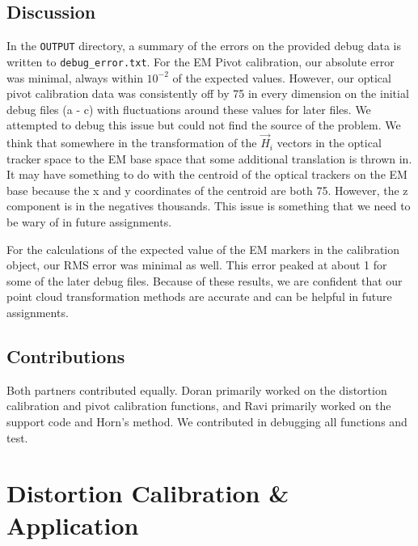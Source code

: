 \documentclass[letterpaper, 11pt]{report}
\begin{document}
\section{Discussion}
In the \texttt{OUTPUT} directory, a summary of the errors on the provided debug data is written to \texttt{debug\_error.txt}. For the EM Pivot calibration, our absolute error was minimal, always within $10^{-2}$ of the expected values. However, our optical pivot calibration data was consistently off by 75 in every dimension on the initial debug files (a - c) with fluctuations around these values for later files. We attempted to debug this issue but could not find the source of the problem.  We think that somewhere in the transformation of the $\vec H_i$ vectors in the optical tracker space to the EM base space that some additional translation is thrown in. It may have something to do with the centroid of the optical trackers on the EM base because the x and y coordinates of the centroid are both 75. However, the z component is in the negatives thousands. This issue is something that we need to be wary of in future assignments.

For the calculations of the expected value of the EM markers in the calibration object, our RMS error was minimal as well. This error peaked at about 1 for some of the later debug files. Because of these results, we are confident that our point cloud transformation methods are accurate and can be helpful in future assignments.


\section{Contributions}
Both partners contributed equally. Doran primarily worked on the distortion calibration and pivot calibration functions, and Ravi primarily worked on the support code and Horn's method. We contributed in debugging all functions and test.
\chapter*{Distortion Calibration \& Application}
\setcounter{chapter}{2}
\setcounter{section}{0}
\end{document}
